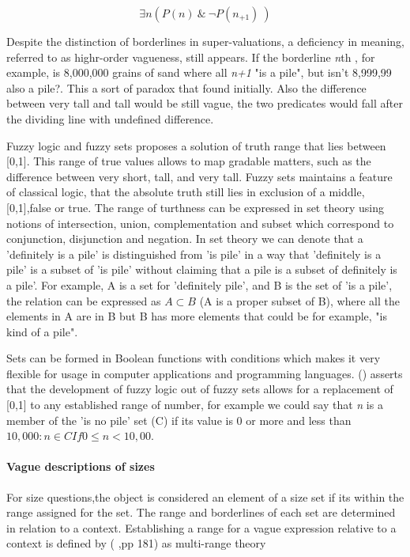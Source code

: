 \[ \exists n( P( n) \ \&\ \neg P( n_{+1}) \ ) \]

Despite the distinction of  borderlines in super-valuations, a deficiency in meaning, referred to as highr-order vagueness, still appears. If the borderline \emph{n}th , for example, is 8,000,000 grains of sand where all \emph{n+1} "is a pile", but isn't 8,999,99 also a pile?. This a sort of paradox that found initially. Also the difference between  very tall and tall would be still vague, the two predicates would fall after the dividing line with undefined difference. 


Fuzzy logic and fuzzy sets proposes a solution of truth range that lies  between [0,1]. This range of true values allows to map gradable matters, such as the difference between very short, tall, and very tall. Fuzzy sets maintains a feature of classical logic, that the absolute truth still lies in exclusion of a middle, [0,1],false or true. The range of turthness can be expressed in set theory using notions of intersection, union,
complementation and subset which correspond to conjunction, disjunction and negation. In set theory we can denote that a 'definitely is a pile' is distinguished from 'is pile' in a way that 'definitely is a pile' is a subset of 'is pile' without claiming that a pile is a subset of definitely is a pile'.  For example,  A is a set for 'definitely pile', and B is the set of 'is a pile', the relation can be expressed as $A\subset B $ (A is a proper subset of B), where all the elements in A are in B but B has more elements that could be for example, "is kind of a pile". 

Sets can be formed in Boolean functions with conditions which makes it very flexible for usage in computer applications and programming languages. (\cite{williamson2002vagueness}) asserts that the development of fuzzy logic out of fuzzy sets allows for a replacement of [0,1] to any established range of number, for example we could say that \emph{n} is a member of the 'is no pile' set (C) if its value is 0 or more and less than $10,000:  n \in  C  If  0≤ n< 10,00.$

\paragraph{Vague descriptions of sizes}

For size questions,the object is considered an element of a size set if its within the range assigned for the set. The range and borderlines of each set are determined in relation to a context. Establishing a range for a vague expression relative to a context is defined by (\cite{raffman1996vagueness} ,pp 181) as  multi-range theory 

